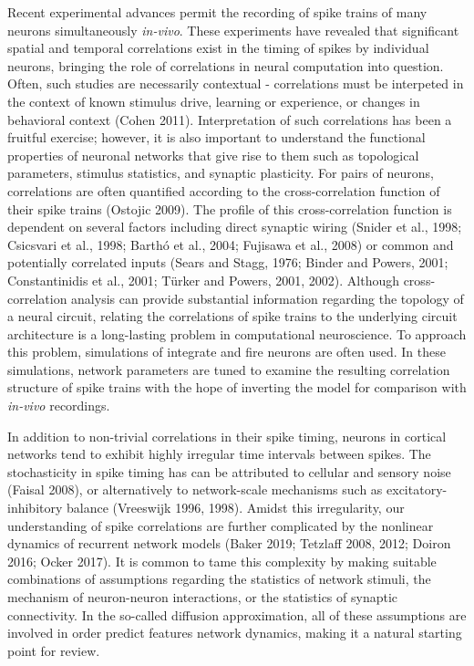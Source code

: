 \documentclass{ucetd}
\begin{document}
Recent experimental advances permit the recording of spike trains of many neurons simultaneously \emph{in-vivo}. These experiments have revealed that significant spatial and temporal correlations exist in the timing of spikes by individual neurons, bringing the role of correlations in neural computation into question. Often, such studies are necessarily contextual - correlations must be interpeted in the context of known stimulus drive, learning or experience, or changes in behavioral context (Cohen 2011). Interpretation of such correlations has been a fruitful exercise; however, it is also important to understand the functional properties of neuronal networks that give rise to them such as topological parameters, stimulus statistics, and synaptic plasticity. For pairs of neurons, correlations are often quantified according to the cross-correlation function of their spike trains (Ostojic 2009). The profile of this cross-correlation function is dependent on several factors including direct synaptic wiring (Snider et al., 1998; Csicsvari et al., 1998; Barthó et al., 2004; Fujisawa et al., 2008) or common and potentially correlated inputs (Sears and Stagg, 1976; Binder and Powers, 2001; Constantinidis et al., 2001; Türker and Powers, 2001, 2002). Although cross-correlation analysis can provide substantial information regarding the topology of a neural circuit, relating the correlations of spike trains to the underlying circuit architecture is a long-lasting problem in computational neuroscience. To approach this problem, simulations of integrate and fire neurons are often used. In these simulations, network parameters are tuned to examine the resulting correlation structure of spike trains with the hope of inverting the model for comparison with \emph{in-vivo} recordings. 

In addition to non-trivial correlations in their spike timing, neurons in cortical networks tend to exhibit highly irregular time intervals between spikes. The stochasticity in spike timing has can be attributed to cellular and sensory noise (Faisal 2008), or alternatively to network-scale mechanisms such as excitatory-inhibitory balance (Vreeswijk 1996, 1998). Amidst this irregularity, our understanding of spike correlations are further complicated by the nonlinear dynamics of recurrent network models (Baker 2019; Tetzlaff 2008, 2012; Doiron 2016; Ocker 2017). It is common to tame this complexity by making suitable combinations of assumptions regarding the statistics of network stimuli, the mechanism of neuron-neuron interactions, or the statistics of synaptic connectivity. In the so-called diffusion approximation, all of these assumptions are involved in order predict features network dynamics, making it a natural starting point for review. 
\end{document}
